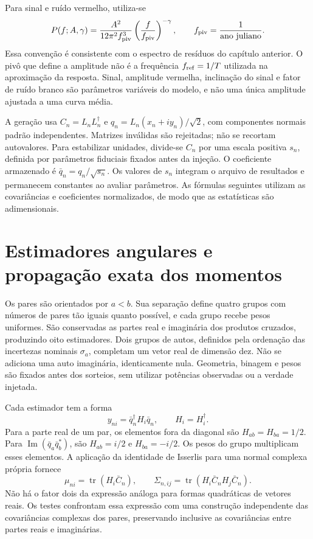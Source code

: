 Para sinal e ruído vermelho, utiliza-se
\begin{equation}
 P(f;A,\gamma)=\frac{A^2}{12\pi^2f_{\rm piv}^3}
                  \left(\frac{f}{f_{\rm piv}}\right)^{-\gamma},
 \qquad f_{\rm piv}=\frac1{\text{ano juliano}}.
 \label{eq:sim-espectro}
\end{equation}
Essa convenção é consistente com o espectro de resíduos do capítulo
anterior. O pivô que define a amplitude não é a frequência
\(f_{\rm ref}=1/T\) utilizada na aproximação da resposta. Sinal,
amplitude vermelha, inclinação do sinal e fator de ruído branco são
parâmetros variáveis do modelo, e não uma única amplitude ajustada a uma
curva média.

A geração usa \(C_n=L_nL_n^\dagger\) e
\(q_n=L_n(x_n+iy_n)/\sqrt2\), com componentes normais padrão
independentes. Matrizes inválidas são rejeitadas; não se recortam
autovalores. Para estabilizar unidades, divide-se \(C_n\) por uma
escala positiva \(s_n\), definida por parâmetros fiduciais fixados antes
da injeção. O coeficiente armazenado é
\(\bar q_n=q_n/\sqrt{s_n}\). Os valores de \(s_n\) integram o
arquivo de resultados e permanecem constantes ao avaliar parâmetros.
As fórmulas seguintes utilizam as covariâncias e coeficientes
normalizados, de modo que as estatísticas são adimensionais.

\section{Estimadores angulares e propagação exata dos momentos}

Os pares são orientados por \(a<b\). Sua separação define quatro
grupos com números de pares tão iguais quanto possível, e cada grupo
recebe pesos uniformes. São conservadas as partes real e imaginária dos
produtos cruzados, produzindo oito estimadores. Dois grupos de autos,
definidos pela ordenação das incertezas nominais \(\sigma_a\), completam
um vetor real de dimensão dez. Não se adiciona uma auto imaginária,
identicamente nula. Geometria, binagem e pesos são fixados antes dos
sorteios, sem utilizar potências observadas ou a verdade injetada.

Cada estimador tem a forma
\begin{equation}
 y_{ni}=\bar q_n^\dagger H_i\bar q_n,\qquad H_i=H_i^\dagger.
 \label{eq:sim-quadratica}
\end{equation}
Para a parte real de um par, os elementos fora da diagonal são
\(H_{ab}=H_{ba}=1/2\). Para
\(\operatorname{Im}(\bar q_a\bar q_b^*)\), são
\(H_{ab}=i/2\) e \(H_{ba}=-i/2\). Os pesos do grupo multiplicam
esses elementos. A aplicação da identidade de Isserlis para uma
normal complexa própria fornece
\begin{equation}
 \mu_{ni}=\operatorname{tr}(H_i\bar C_n),\qquad
 \Sigma_{n,ij}=\operatorname{tr}
                   (H_i\bar C_nH_j\bar C_n).
 \label{eq:sim-momentos}
\end{equation}
Não há o fator dois da expressão análoga para formas quadráticas de
vetores reais. Os testes confrontam essa expressão com uma construção
independente das covariâncias complexas dos pares, preservando inclusive
as covariâncias entre partes reais e imaginárias.

